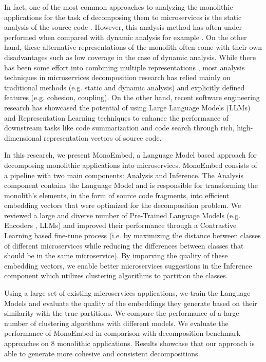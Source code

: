 In fact, one of the most common approaches to analyzing the monolithic applications for the task of decomposing them to microservices is the static analysis of the source code \cite{Abgaz2023decompsurvey}. However, this analysis method has often under-performed when compared with dynamic analysis for example \cite{desai2021cogcn,kalia2021mono2micro}. On the other hand, these alternative representations of the monolith often come with their own disadvantages such as low coverage in the case of dynamic analysis. While there has been some effort into combining multiple representations \cite{mathai2022chgnn,khaled2022hydecomp,qian2023gdcdvf}, most analysis techniques in microservices decomposition research has relied mainly on traditional methods (e.g. static and dynamic analysis) and explicitly defined features (e.g. cohesion, coupling). On the other hand, recent software engineering research has showcased the potential of using Large Language Models (LLMs) \cite{niu2023codeembedreview} and Representation Learning techniques \cite{guo2022unixcoder,wang2023codet5p} to enhance the performance of downstream tasks \cite{Torregrossa2023embeddingssurvey} like code summarization and code search \cite{junkai2024codesearch} through rich, high-dimensional representation vectors of source code. 



In this research, we present MonoEmbed, a Language Model based approach for decomposing monolithic applications into microservices. MonoEmbed consists of a pipeline with two main components: Analysis and Inference. The Analysis component contains the Language Model and is responsible for transforming the monolith's elements, in the form of source code fragments, into efficient embedding vectors that were optimized for the decomposition problem. We reviewed a large and diverse number of Pre-Trained Language Models (e.g. Encoders \cite{guo2021graphcodebert} , LLMs\cite{aimeta2024llama3modelcard}) and improved their performance through a Contrastive Learning based fine-tune process (i.e. by maximizing the distance between classes of different microservices while reducing the differences between classes that should be in the same microservice). By imporving the quality of these embedding vectors, we enable better microservices suggestions in the Inference component which utilizes clustering algorithms to partition the classes.

Using a large set of existing microservices applications, we train the Language Models and evaluate the quality of the embeddings they generate based on their similarity with the true partitions. We compare the performance of a large number of clustering algorithms with different models. We evaluate the performance of MonoEmbed in comparison with decomposition benchmark approaches on 8 monolithic applications. Results showcase that our approach is able to generate more cohesive and consistent decompositions. 

